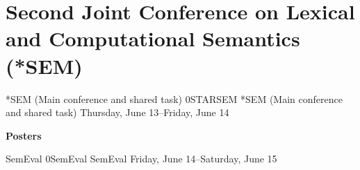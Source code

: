 \chapter{Second Joint Conference on Lexical and Computational Semantics (*SEM)}
\thispagestyle{emptyheader}

\cleardoublepage

\clearpage


\clearpage
\begin{wsschedule}
{*SEM (Main conference and shared task)}
{0}{STARSEM}
{*SEM (Main conference and shared task)}
{Thursday, June 13--Friday, June 14}{\SSemLoc}

\end{wsschedule}

\clearpage



\clearpage
\par\centerline{\bfseries\large Posters}\vspace{1em}\par


\clearpage
\begin{wsschedule}
{SemEval}
{0}{SemEval}
{SemEval}
{Friday, June 14--Saturday, June 15}{\SemEvalLoc}

\end{wsschedule}
